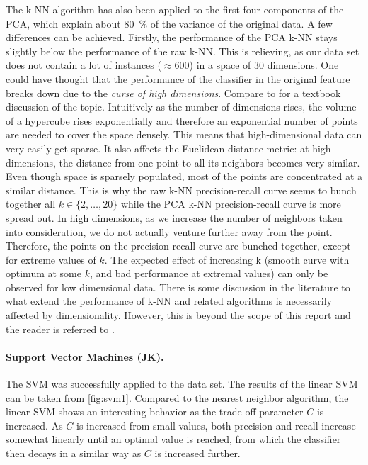 \documentclass[12pt, a4paper]{scrartcl}
\begin{document}
The k-NN algorithm has also been applied to the first four components of the PCA, which explain about \SI{80}{\percent} of the variance of the original data. A few differences can be achieved. Firstly, the performance of the PCA k-NN stays slightly below the performance of the raw k-NN. This is relieving, as our data set does not contain a lot of instances ($\approx 600$) in a space of 30 dimensions. One could have thought that the performance of the classifier in the original feature breaks down due to the \emph{curse of high dimensions}. Compare to \cite{barber2012brm, bishop2006prm} for a textbook discussion of the topic.
Intuitively as the number of dimensions rises, the volume of a hypercube rises exponentially and therefore an exponential number of points are needed to cover the space densely. This means that high-dimensional data can very easily get sparse. It also affects the Euclidean distance metric: at high dimensions, the distance from one point to all its neighbors becomes very similar. Even though  space is sparsely populated, most of the points are concentrated at a similar distance. 
This is why the raw k-NN precision-recall curve seems to bunch together all $k\in \{2,\dots, 20\}$ while the PCA k-NN precision-recall curve is more spread out. In high dimensions, as we increase the number of neighbors taken into consideration, we do not actually venture further away from the point. Therefore, the points on the precision-recall curve are bunched together, except for extreme values of $k$. The expected effect of increasing k (smooth curve with optimum at some $k$, and bad performance at extremal values) can only be observed for low dimensional data.
There is some discussion in the literature to what extend the performance of k-NN and related algorithms is necessarily affected by dimensionality. However, this is beyond the scope of this report and the reader is referred to \cite{marimont1979nearest, Chavez01searchingin, paper3}.

\paragraph{Support Vector Machines (JK).} The SVM was successfully applied to the data set. The results of the linear SVM can be taken from \cref{fig:svm1}. Compared to the nearest neighbor algorithm, the linear SVM shows an interesting behavior as the trade-off parameter $C$ is increased. As $C$ is increased from small values, both precision and recall increase somewhat linearly until an optimal value is reached, from which the classifier then decays in a similar way as $C$ is increased further.
\end{document}
